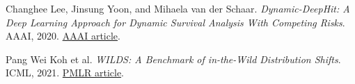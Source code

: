 \documentclass[10pt,a4paper]{article}
\begin{document}
\begin{enumerate}[label={[\arabic*]},leftmargin=7mm,itemsep=1.5pt]
  \item Changhee Lee, Jinsung Yoon, and Mihaela van der Schaar.
  \textit{Dynamic-DeepHit: A Deep Learning Approach for Dynamic Survival Analysis
  With Competing Risks}. AAAI, 2020.
  \href{https://ojs.aaai.org/index.php/AAAI/article/view/5965}{AAAI article}.
  \item Pang Wei Koh et al.
  \textit{WILDS: A Benchmark of in-the-Wild Distribution Shifts}.
  ICML, 2021.
  \href{https://proceedings.mlr.press/v139/koh21a.html}{PMLR article}.
\end{enumerate}
\end{document}
